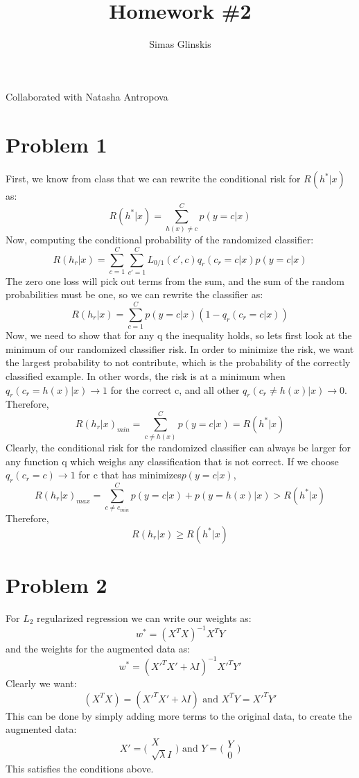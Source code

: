 \documentclass[]{article}
\title{Homework \#2}
\author{Simas Glinskis}
\begin{document}
\maketitle
Collaborated with Natasha Antropova
\section*{Problem 1}
First, we know from class that we can rewrite the conditional risk for $R(h^*|x)$ as:
\[
R(h^*|x) = \sum_{h(x)\neq c}^{C}p(y=c|x)
\]
Now, computing the conditional probability of the randomized classifier:
\[
R(h_r|x) = \sum_{c=1}^C\sum_{c'=1}^{C} L_{0/1}(c',c)q_r(c_r=c|x)p(y=c|x)
\]
The zero one loss will pick out terms from the sum, and the sum of the random probabilities must be one, so we can rewrite the classifier as:
\[
R(h_r|x) = \sum_{c=1}^{C}p(y=c|x)(1-q_r(c_r=c|x))
\]
Now, we need to show that for any q the inequality holds, so lets first look at the minimum of our randomized classifier risk. In order to minimize the risk, we want the largest probability to not contribute, which is the probability of the correctly classified example. In other words, the risk is at a minimum when $q_r(c_r=h(x)|x)\rightarrow1$ for the correct c, and all other $q_r(c_r\neq h(x)|x)\rightarrow 0$.
Therefore,
\[
R(h_r|x)_{min} = \sum_{c\neq h(x)}^{C}p(y=c|x) = R(h^*|x)
\]
Clearly, the conditional risk for the randomized classifier can always be larger for any function q which weighs any classification that is not correct. If we choose $q_r(c_r=c)\rightarrow 1$ for c that has minimizes$p(y=c|x)$,
\[
R(h_r|x)_{max} = \sum_{c\neq c_{min}}^{C}p(y=c|x) +p(y=h(x)|x) > R(h^*|x)
\]
Therefore,
\[
R(h_r|x) \geq R(h^*|x)
\]
\section*{Problem 2}
For $L_2$ regularized regression we can write our weights as:
\[
w^* = (X^TX)^{-1}X^TY
\]
and the weights for the augmented data as:
\[
w^* = (X'^TX'+\lambda I)^{-1}X'^TY'
\]
Clearly we want:
\[
(X^TX) = (X'^TX'+\lambda I) \text{ and } X^TY=X'^TY'
\]
This can be done by simply adding more terms to the original data, to create the augmented data:
\[
X' = \Big(\begin{matrix}
X \\ \sqrt{\lambda}I
\end{matrix}\Big) \text{ and } Y = \Big(\begin{matrix}
Y \\ 0
\end{matrix}\Big)
\]
This satisfies the conditions above. 
\end{document}
